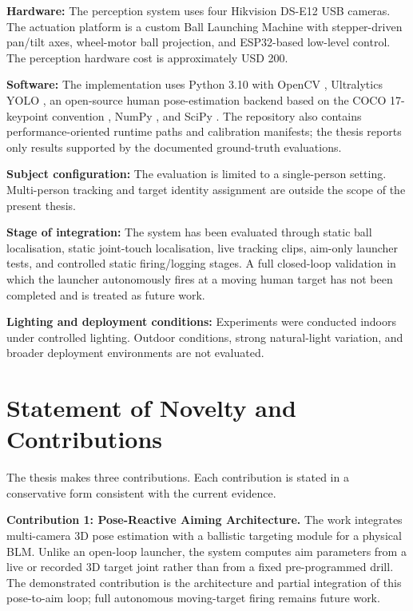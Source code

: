 \textbf{Hardware:} The perception system uses four Hikvision DS-E12 USB cameras. The actuation platform is a custom Ball Launching Machine with stepper-driven pan/tilt axes, wheel-motor ball projection, and ESP32-based low-level control. The perception hardware cost is approximately USD 200.

\textbf{Software:} The implementation uses Python 3.10 with OpenCV \cite{ref27}, Ultralytics YOLO \cite{ref14}, an open-source human pose-estimation backend based on the COCO 17-keypoint convention \cite{ref16, ref17}, NumPy \cite{ref28}, and SciPy \cite{ref29}. The repository also contains performance-oriented runtime paths and calibration manifests; the thesis reports only results supported by the documented ground-truth evaluations.

\textbf{Subject configuration:} The evaluation is limited to a single-person setting. Multi-person tracking and target identity assignment are outside the scope of the present thesis.

\textbf{Stage of integration:} The system has been evaluated through static ball localisation, static joint-touch localisation, live tracking clips, aim-only launcher tests, and controlled static firing/logging stages. A full closed-loop validation in which the launcher autonomously fires at a moving human target has not been completed and is treated as future work.

\textbf{Lighting and deployment conditions:} Experiments were conducted indoors under controlled lighting. Outdoor conditions, strong natural-light variation, and broader deployment environments are not evaluated.

\section{Statement of Novelty and Contributions}

The thesis makes three contributions. Each contribution is stated in a conservative form consistent with the current evidence.

\textbf{Contribution 1: Pose-Reactive Aiming Architecture.}
The work integrates multi-camera 3D pose estimation with a ballistic targeting module for a physical BLM. Unlike an open-loop launcher, the system computes aim parameters from a live or recorded 3D target joint rather than from a fixed pre-programmed drill. The demonstrated contribution is the architecture and partial integration of this pose-to-aim loop; full autonomous moving-target firing remains future work.

